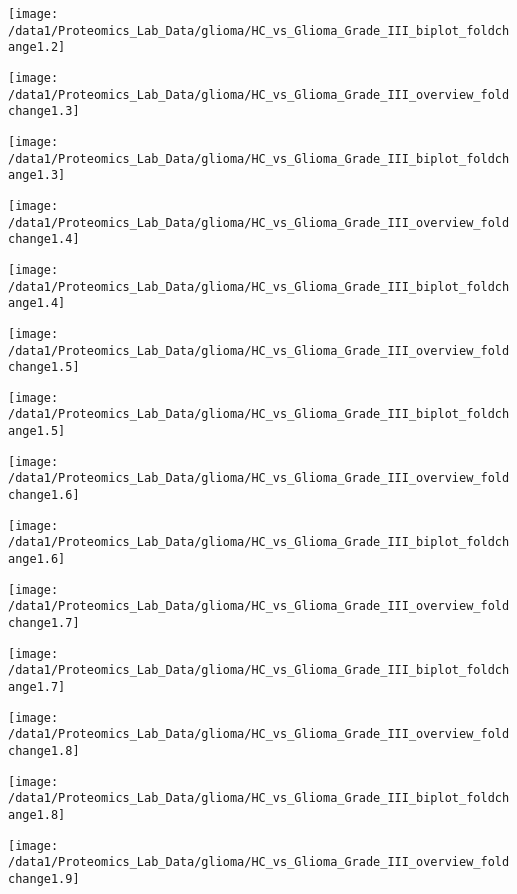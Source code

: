 \documentclass{article}
\begin{document}
\centerline{\texttt{[image: /data1/Proteomics\_Lab\_Data/glioma/HC\_vs\_Glioma\_Grade\_III\_biplot\_foldchange1.2]}}

\clearpage\centerline{\texttt{[image: /data1/Proteomics\_Lab\_Data/glioma/HC\_vs\_Glioma\_Grade\_III\_overview\_foldchange1.3]}}

\centerline{\texttt{[image: /data1/Proteomics\_Lab\_Data/glioma/HC\_vs\_Glioma\_Grade\_III\_biplot\_foldchange1.3]}}

\clearpage\centerline{\texttt{[image: /data1/Proteomics\_Lab\_Data/glioma/HC\_vs\_Glioma\_Grade\_III\_overview\_foldchange1.4]}}

\centerline{\texttt{[image: /data1/Proteomics\_Lab\_Data/glioma/HC\_vs\_Glioma\_Grade\_III\_biplot\_foldchange1.4]}}

\clearpage\centerline{\texttt{[image: /data1/Proteomics\_Lab\_Data/glioma/HC\_vs\_Glioma\_Grade\_III\_overview\_foldchange1.5]}}

\centerline{\texttt{[image: /data1/Proteomics\_Lab\_Data/glioma/HC\_vs\_Glioma\_Grade\_III\_biplot\_foldchange1.5]}}

\clearpage\centerline{\texttt{[image: /data1/Proteomics\_Lab\_Data/glioma/HC\_vs\_Glioma\_Grade\_III\_overview\_foldchange1.6]}}

\centerline{\texttt{[image: /data1/Proteomics\_Lab\_Data/glioma/HC\_vs\_Glioma\_Grade\_III\_biplot\_foldchange1.6]}}

\clearpage\centerline{\texttt{[image: /data1/Proteomics\_Lab\_Data/glioma/HC\_vs\_Glioma\_Grade\_III\_overview\_foldchange1.7]}}

\centerline{\texttt{[image: /data1/Proteomics\_Lab\_Data/glioma/HC\_vs\_Glioma\_Grade\_III\_biplot\_foldchange1.7]}}

\clearpage\centerline{\texttt{[image: /data1/Proteomics\_Lab\_Data/glioma/HC\_vs\_Glioma\_Grade\_III\_overview\_foldchange1.8]}}

\centerline{\texttt{[image: /data1/Proteomics\_Lab\_Data/glioma/HC\_vs\_Glioma\_Grade\_III\_biplot\_foldchange1.8]}}

\clearpage\centerline{\texttt{[image: /data1/Proteomics\_Lab\_Data/glioma/HC\_vs\_Glioma\_Grade\_III\_overview\_foldchange1.9]}}
\end{document}
